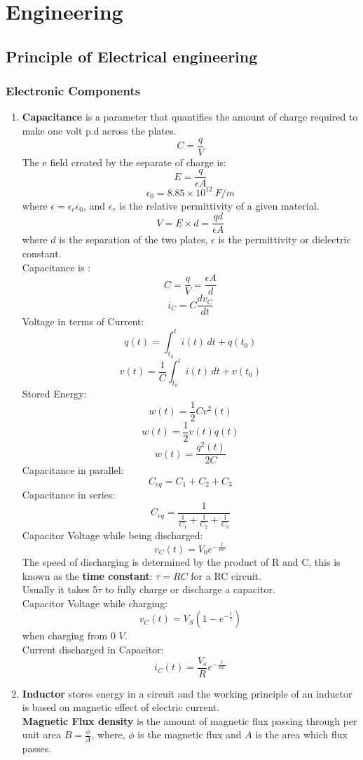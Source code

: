 \documentclass{article}
\begin{document}
\newpage 
\section{Engineering}
\subsection{Principle of Electrical engineering}
\subsubsection{Electronic Components}
\begin{enumerate}
    \item \textbf{Capacitance} is a parameter that quantifies the amount of charge required to make one volt p.d across the plates.
\[C=\frac{q}{V}\]
The e field created by the separate of charge is:
\[E=\frac{q}{\epsilon A}\] 
\[\epsilon_0 =8.85\times10^12\ F/m\]
where $\epsilon = \epsilon_r \epsilon_0$, and $\epsilon_r$ is the relative permittivity of a given material. 
\[V=E\times d=\frac{qd}{\epsilon A}\]
where $d$ is the separation of the two plates, $\epsilon$ is the permittivity or dielectric constant.\\
Capacitance is :
\[C=\frac{q}{V}=\frac{\epsilon A}{d}\]
\[i_C = C\frac{dv_C}{dt}\]
Voltage in terms of Current:
\[q(t)=\int^t_{t_0}{i(t)\, dt+q(t_0)}\]
\[v(t)=\frac{1}{C}\int^t_{t_0}{i(t)\, dt+v(t_0)}\]
Stored Energy:
\[w(t)=\frac{1}{2}Cv^2(t)\]
\[w(t)=\frac{1}{2}v(t)q(t)\]
\[w(t)=\frac{q^2(t)}{2C}\]
Capacitance in parallel:
\[C_{eq} = C_1+C_2+C_3\]
Capacitance in series:
\[C_{eq}=\frac{1}{\frac{1}{C_1}+\frac{1}{C_2}+\frac{1}{C_3}}\]
Capacitor Voltage while being discharged:
\[v_{C}(t)=V_0e^{-\frac{t}{RC}}\]
The speed of discharging is determined by the product of R and C, this is known as the \textbf{time constant}: $\tau=RC$ for a RC circuit.\\
Usually it takes 5$\tau$ to fully charge or discharge a capacitor.\\
Capacitor Voltage while charging:
\[v_{C}(t)=V_S(1-e^{-\frac{t}{\tau}})\] when charging from 0 $V$.\\
Current discharged in Capacitor:
\[i_C(t)=\frac{V_s}{R}e^{-\frac{t}{RC}}\]
    \item \textbf{Inductor} stores energy in a circuit and the working principle of an inductor is based on magnetic effect of electric current.\\
\textbf{Magnetic Flux density} is the amount of magnetic flux passing through per unit area $B = \frac{\phi}{A}$, where, $\phi$ is the magnetic flux and $A$ is the area which flux passes.

\end{enumerate}
\end{document}
